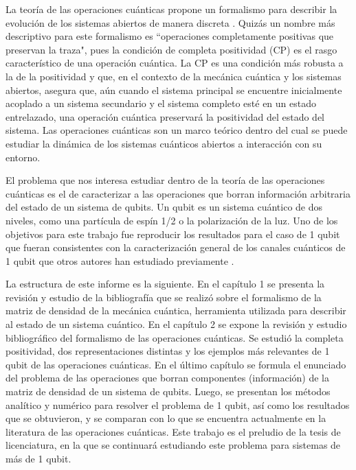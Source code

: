 La teoría de las operaciones cuánticas propone un formalismo para
describir la evolución de los sistemas abiertos de manera discreta
\cite{nielsen_chuang_2011}. 
Quizás un nombre más descriptivo para este formalismo es 
``operaciones completamente positivas que preservan la traza",
pues la condición de completa positividad (CP) es el rasgo característico 
de una operación cuántica. La CP es una condición más robusta  
a la de la positividad y que, en el contexto de la
mecánica cuántica y los sistemas abiertos, asegura que, aún 
cuando el sistema principal se encuentre inicialmente acoplado 
a un sistema secundario y el sistema completo esté en 
un estado entrelazado, una operación cuántica preservará 
la positividad del estado del sistema. Las operaciones cuánticas son un
marco teórico dentro del cual se puede estudiar la dinámica de los 
sistemas cuánticos abiertos a interacción con su entorno. 

El problema que nos interesa estudiar dentro de la teoría de 
las operaciones cuánticas es el de caracterizar a las
operaciones que borran información arbitraria del estado de un sistema
de qubits. Un qubit es un sistema cuántico de dos niveles, 
como una partícula de espín 1/2 o la polarización de la luz. 
Uno de los objetivos para este trabajo fue reproducir los
resultados para el caso de 1 qubit que fueran 
consistentes con la caracterización general de 
los canales cuánticos de 1 qubit que otros autores han 
estudiado previamente 
\cite{bengtsson_zyczkowski_2017,nielsen_chuang_2011}.

La estructura de este informe es la siguiente. En el capítulo 1
se presenta la revisión y estudio de la bibliografía que se realizó 
sobre el formalismo de la matriz de densidad de la mecánica cuántica, 
herramienta utilizada para describir 
al estado de un sistema cuántico. En el capítulo 2 se expone 
la revisión y estudio bibliográfico del formalismo de las 
operaciones cuánticas. Se estudió la completa positividad, 
dos representaciones distintas y los ejemplos más relevantes 
de 1 qubit de las operaciones cuánticas. En el último capítulo
se formula el enunciado del problema de las operaciones que borran 
componentes (información) de la matriz de densidad de un sistema de 
qubits. Luego, se presentan los métodos analítico y numérico 
para resolver el problema de 1 qubit, así como los resultados 
que se obtuvieron, y se comparan con lo que se encuentra actualmente
en la literatura de las operaciones cuánticas. Este trabajo 
es el preludio de la tesis de licenciatura, en la que se continuará 
estudiando este problema para sistemas de más de 1 qubit.


